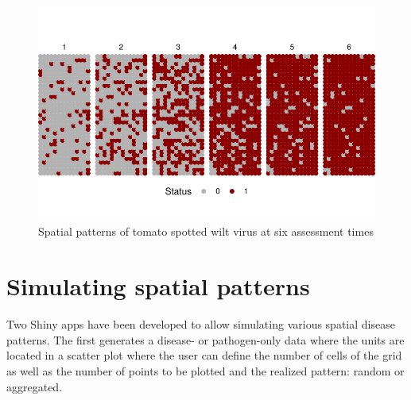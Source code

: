 \documentclass[
  letterpaper,
  DIV=11,
  numbers=noendperiod]{scrreprt}
\begin{document}
\begin{figure}[H]

{\centering \includegraphics{spatial-patterns_files/figure-pdf/fig-spatiotemporal1-1.pdf}

}

\caption{\label{fig-spatiotemporal1}Spatial patterns of tomato spotted
wilt virus at six assessment times}

\end{figure}

\hypertarget{simulating-spatial-patterns}{%
\section{Simulating spatial
patterns}\label{simulating-spatial-patterns}}

Two Shiny apps have been developed to allow simulating various spatial
disease patterns. The first generates a disease- or pathogen-only data
where the units are located in a scatter plot where the user can define
the number of cells of the grid as well as the number of points to be
plotted and the realized pattern: random or aggregated.
\end{document}

